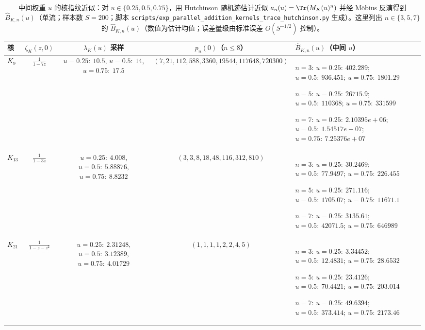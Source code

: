 \begin{table}[H]
\centering
\scriptsize
\setlength{\tabcolsep}{6pt}
\renewcommand{\arraystretch}{1.15}
\caption{中间权重 $u$ 的核指纹近似：对 $u\in\{0.25,0.5,0.75\}$，用 Hutchinson 随机迹估计近似 $a_n(u)=\Tr(M_K(u)^n)$ 并经 Möbius 反演得到 $\widehat B_{K,n}(u)$（单流；样本数 $S=200$；脚本 \texttt{scripts/exp\_parallel\_addition\_kernels\_trace\_hutchinson.py} 生成）。这里列出 $n\in\{3,5,7\}$ 的 $\widehat B_{K,n}(u)$（数值为估计均值；误差量级由标准误差 $O(S^{-1/2})$ 控制）。}
\label{tab:parallel-addition-kernels-fingerprint-u-samples}
\begin{tabular}{@{}lccc p{}@{}}
\toprule
核 & $\zeta_K(z,0)$ & $\lambda_K(u)$ 采样 & $p_n(0)$（$n\le 8$） & $\widehat B_{K,n}(u)$（中间 $u$） \\
\midrule
$K_{9}$ & $\frac{1}{1-7z}$ & $u=0.25:\ 10.5$, $u=0.5:\ 14$, $u=0.75:\ 17.5$ & $(7,21,112,588,3360,19544,117648,720300)$ & $n=3$: $u=0.25:\ 402.289$; $u=0.5:\ 936.451$; $u=0.75:\ 1801.29$\par $n=5$: $u=0.25:\ 26715.9$; $u=0.5:\ 110368$; $u=0.75:\ 331599$\par $n=7$: $u=0.25:\ 2.10395e+06$; $u=0.5:\ 1.54517e+07$; $u=0.75:\ 7.25376e+07$ \\
$K_{13}$ & $\frac{1}{1-3z}$ & $u=0.25:\ 4.008$, $u=0.5:\ 5.88876$, $u=0.75:\ 8.8232$ & $(3,3,8,18,48,116,312,810)$ & $n=3$: $u=0.25:\ 30.2469$; $u=0.5:\ 77.9497$; $u=0.75:\ 226.455$\par $n=5$: $u=0.25:\ 271.116$; $u=0.5:\ 1705.07$; $u=0.75:\ 11671.1$\par $n=7$: $u=0.25:\ 3135.61$; $u=0.5:\ 42071.5$; $u=0.75:\ 646989$ \\
$K_{21}$ & $\frac{1}{1-z-z^2}$ & $u=0.25:\ 2.31248$, $u=0.5:\ 3.12389$, $u=0.75:\ 4.01729$ & $(1,1,1,1,2,2,4,5)$ & $n=3$: $u=0.25:\ 3.34452$; $u=0.5:\ 12.4831$; $u=0.75:\ 28.6532$\par $n=5$: $u=0.25:\ 23.4126$; $u=0.5:\ 70.4421$; $u=0.75:\ 203.014$\par $n=7$: $u=0.25:\ 49.6394$; $u=0.5:\ 373.414$; $u=0.75:\ 2173.46$ \\
\bottomrule
\end{tabular}
\end{table}
